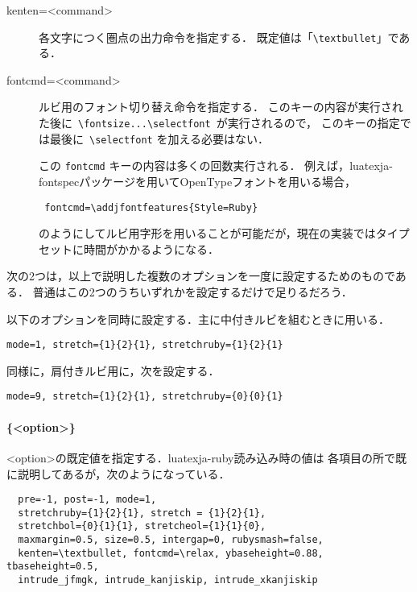 \documentclass[a4paper,10ptj]{ltjsarticle}
\def\cs#1{\eghostguarded{\texttt{\textbackslash#1}}}
\begin{document}
\begin{description}
\item[kenten=<command>]各文字につく圏点の出力命令を指定する．
  既定値は「\verb+\textbullet+」である．

\item[fontcmd=<command>]ルビ用のフォント切り替え命令を指定する．
このキーの内容が実行された後に\ \verb+\fontsize...\selectfont+\ が実行されるので，
このキーの指定では最後に\ \verb+\selectfont+ を加える必要はない．

この \texttt{fontcmd} キーの内容は多くの回数実行される．
例えば，\textsf{luatexja-fontspec}パッケージを用いてOpenTypeフォントを用いる場合，
\begin{lstlisting}
 fontcmd=\addjfontfeatures{Style=Ruby}
\end{lstlisting}
のようにしてルビ用字形を用いることが可能だが，現在の実装ではタイプセットに時間がかかるようになる．

\end{description}

\medskip
次の2つは，以上で説明した複数のオプションを一度に設定するためのものである．
普通はこの2\nobreak つのうちいずれかを設定するだけで足りるだろう．

\begin{description}
\def\makelabel#1{\ttfamily\bfseries #1}
\item[naka] 以下のオプションを同時に設定する．主に中付きルビを組むときに用いる．
\begin{verbatim}
mode=1, stretch={1}{2}{1}, stretchruby={1}{2}{1}
\end{verbatim}
\item[kata] 同様に，肩付きルビ用に，次を設定する．
\begin{verbatim}
mode=9, stretch={1}{2}{1}, stretchruby={0}{0}{1}
\end{verbatim}
\end{description}

\paragraph{\cs{ltjsetruby}\{<option>\}}
<option>の既定値を指定する．\textsf{luatexja-ruby}読み込み時の値は
各項目の所で既に説明してあるが，次のようになっている．
\begin{verbatim}
  pre=-1, post=-1, mode=1, 
  stretchruby={1}{2}{1}, stretch = {1}{2}{1},
  stretchbol={0}{1}{1}, stretcheol={1}{1}{0},
  maxmargin=0.5, size=0.5, intergap=0, rubysmash=false,
  kenten=\textbullet, fontcmd=\relax, ybaseheight=0.88, tbaseheight=0.5,
  intrude_jfmgk, intrude_kanjiskip, intrude_xkanjiskip
\end{verbatim}
\end{document}
